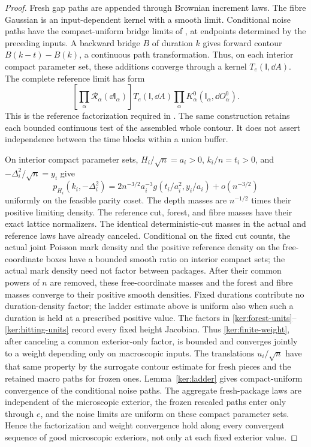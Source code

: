 \begin{proof}
Fresh gap paths are appended through Brownian increment laws.
The fibre Gaussian is an input-dependent kernel with a smooth limit.
Conditional noise paths have the compact-uniform bridge limits of
, at endpoints determined by the preceding inputs.
A backward bridge \(B\) of duration \(k\) gives forward contour
\(B(k-t)-B(k)\), a continuous path transformation. Thus, on each
interior compact parameter set, these additions converge through a
kernel \(T_e(\mathsf I,\dd A)\). The complete reference limit has form
\begin{equation}\label{ker:augmented-reference-limit}
 \left[\prod_\alpha\mathcal R_\alpha(\dd\mathsf I_\alpha)\right]
 T_e(\mathsf I,\dd A)
 \prod_\alpha K^0_\alpha(\mathsf I_\alpha,\dd O^0_\alpha).
\end{equation}
This is the reference factorization required in
. The same construction retains each bounded
continuous test of the assembled whole contour. It does not assert
independence between the time blocks within a union buffer.

On interior compact parameter sets, \(H_i/\sqrt n=a_i>0\),
\(k_i/n=t_i>0\), and \(-\Delta_i^2/\sqrt n=y_i\) give
\[
 p_{H_i}(k_i,-\Delta_i^2)
 =2n^{-3/2}a_i^{-3}g(t_i/a_i^2,y_i/a_i)+o(n^{-3/2})
\]
uniformly on the feasible parity coset.  The depth masses are
\(n^{-1/2}\) times their positive limiting density. The reference
cut, forest, and fibre masses have their exact lattice normalizers.
The identical deterministic-cut masses in the actual and reference
laws have already canceled. Conditional on the fixed cut counts,
the actual joint Poisson mark density and the positive reference
density on the free-coordinate boxes have a bounded smooth ratio
on interior compact sets; the actual mark density need not factor
between packages. After their common powers of \(n\) are removed,
these free-coordinate masses and the forest and fibre masses
converge to their positive smooth densities. Fixed durations
contribute no duration-density factor; the ladder estimate above is
uniform also when such a duration is held at a prescribed positive
value. The factors in
\eqref{ker:forest-units}--\eqref{ker:hitting-units} record every fixed
height Jacobian.  Thus \eqref{ker:finite-weight}, after canceling a
common exterior-only factor, is bounded and converges jointly to a
weight depending only on macroscopic inputs.  The translations
\(u_i/\sqrt n\) have that same property by the surrogate contour
estimate for fresh pieces and the retained macro paths for frozen
ones.  Lemma~\ref{ker:ladder} gives compact-uniform convergence of
the conditional noise paths. The aggregate fresh-package laws are
independent of the microscopic exterior, the frozen rescaled paths enter only through \(e\), and the
noise limits are uniform on these compact parameter sets. Hence the
factorization and weight convergence hold along every convergent
sequence of good microscopic exteriors, not only at each fixed
exterior value.


\end{proof}
